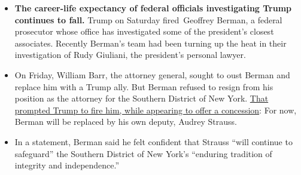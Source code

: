 \begin{itemize}
\item
  \textbf{The career-life expectancy of federal officials investigating
  Trump continues to fall.} Trump on Saturday fired~Geoffrey Berman, a
  federal prosecutor whose office has investigated some of the
  president's closest associates. Recently Berman's team had been
  turning up the heat in their investigation of Rudy Giuliani, the
  president's personal lawyer.
\item
  On Friday, William Barr, the attorney general, sought to oust Berman
  and replace him with a Trump ally. But Berman refused to resign from
  his position as the attorney for the Southern District of New York.
  \href{https://www.nytimes3xbfgragh.onion/2020/06/20/nyregion/trump-geoffrey-berman-fired-sdny.html?action=click\&module=Top\%20Stories\&pgtype=Homepage}{That
  prompted Trump to fire him, while appearing to offer a concession}:
  For now, Berman will be replaced by his own deputy, Audrey Strauss.
\item
  In a statement, Berman said he felt confident that Strauss ``will
  continue to safeguard'' the Southern District of New York's ``enduring
  tradition of integrity and independence.''
\end{itemize}

